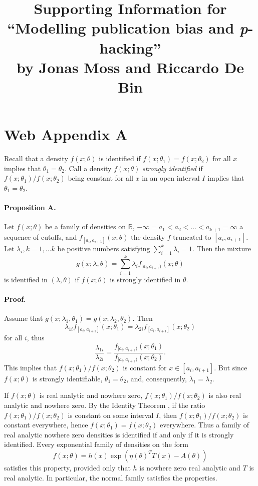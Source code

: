 \documentclass[english]{article}
\title{Supporting Information for ``Modelling publication bias and \textit{p}-hacking''\\ by Jonas Moss and Riccardo De Bin}
\author{}
\date{}
\begin{document}
\maketitle


\section*{Web Appendix A}

Recall that a density $f(x;\theta)$ is identified if $f(x;\theta_{1})=f(x;\theta_{2})$
for all $x$ implies that $\theta_{1}=\theta_{2}.$ Call a density
$f(x;\theta)$ \textit{strongly identified} if $f(x;\theta_{1})/f(x;\theta_{2})$
being constant for all $x$ in an open interval $I$ implies that
$\theta_{1}=\theta_{2}$.
\paragraph{Proposition A.}\label{prop:identified}

Let $f(x;\theta)$ be a family of densities on $\mathbb{R}$, $-\infty=a_{1}<a_{2}<\ldots<a_{k+1}=\infty$
a sequence of cutoffs, and $f_{[a_{i},a_{i+1}]}(x;\theta)$ the density
$f$ truncated to $[a_{i},a_{i+1}]$. Let $\lambda_{i},k=1,\ldots k$
be positive numbers satisfying $\sum_{i=1}^{k}\lambda_{i}=1$. Then
the mixture
\[
g(x;\lambda,\theta)=\sum_{i=1}^{k}\lambda_{i}f_{[a_{i},a_{i+1})}(x;\theta)
\]
is identified in $(\lambda,\theta)$ if $f(x;\theta)$ is strongly
identified in $\theta$.

\paragraph{Proof.}
Assume that $g(x;\lambda_{1},\theta_{1})=g(x;\lambda_{2},\theta_{2})$.
Then $$\lambda_{1i}f_{[a_{i},a_{i+1}]}(x;\theta_{1})=\lambda_{2i}f_{[a_{i},a_{i+1}]}(x;\theta_{2})$$
for all $i$, thus
\[
\frac{\lambda_{1i}}{\lambda_{2i}}=\frac{f_{[a_{i},a_{i+1})}(x;\theta_{1})}{f_{[a_{i},a_{i+1})}(x;\theta_{2})}.
\]
This implies that $f(x;\theta_{1})/f(x;\theta_{2})$ is constant for
$x\in[a_{i},a_{i+1}]$. But since $f(x;\theta)$ is strongly identifiable,
$\theta_{1}=\theta_{2}$, and, consequently, $\lambda_1 = \lambda_2$.


If $f(x;\theta)$ is real analytic and nowhere zero, $f(x;\theta_{1})/f(x;\theta_{2})$
is also real analytic and nowhere zero. By the Identity Theorem \citep[Corollary 1.2.6]{Krantz2002-bt}, if the ratio
$f(x;\theta_{1})/f(x;\theta_{2})$ is constant on some interval $I$,
then $f(x;\theta_{1})/f(x;\theta_{2})$ is constant everywhere, hence
$f(x;\theta_{1})=f(x;\theta_{2})$ everywhere. Thus a family of real
analytic nowhere zero densities is identified if and only if it is
strongly identified. Every exponential family of densities on the form
\[
f(x;\theta)=h(x)\exp(\eta(\theta)^{T}T(x)-A(\theta))
\]
satisfies this property, provided only that $h$ is nowhere zero real analytic
and $T$ is real analytic. In particular, the normal family satisfies
the properties.
\end{document}
